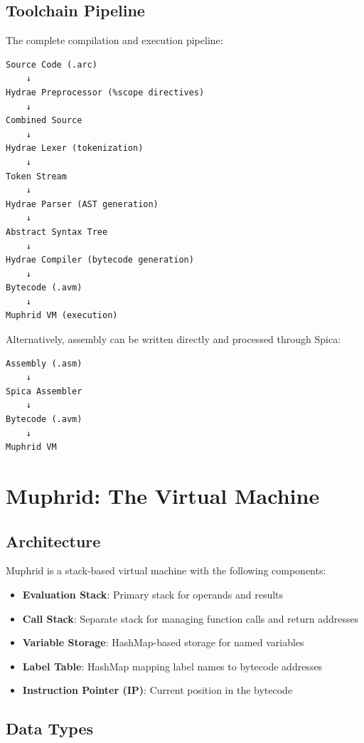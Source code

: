 \documentclass[11pt,a4paper]{article}
\begin{document}
\subsection{Toolchain Pipeline}

The complete compilation and execution pipeline:

\begin{verbatim}
Source Code (.arc)
    ↓
Hydrae Preprocessor (%scope directives)
    ↓
Combined Source
    ↓
Hydrae Lexer (tokenization)
    ↓
Token Stream
    ↓
Hydrae Parser (AST generation)
    ↓
Abstract Syntax Tree
    ↓
Hydrae Compiler (bytecode generation)
    ↓
Bytecode (.avm)
    ↓
Muphrid VM (execution)
\end{verbatim}

Alternatively, assembly can be written directly and processed through Spica:

\begin{verbatim}
Assembly (.asm)
    ↓
Spica Assembler
    ↓
Bytecode (.avm)
    ↓
Muphrid VM
\end{verbatim}

\newpage
\section{Muphrid: The Virtual Machine}

\subsection{Architecture}

Muphrid is a stack-based virtual machine with the following components:

\begin{itemize}
    \item \textbf{Evaluation Stack}: Primary stack for operands and results
    \item \textbf{Call Stack}: Separate stack for managing function calls and return addresses
    \item \textbf{Variable Storage}: HashMap-based storage for named variables
    \item \textbf{Label Table}: HashMap mapping label names to bytecode addresses
    \item \textbf{Instruction Pointer (IP)}: Current position in the bytecode
\end{itemize}

\subsection{Data Types}
\end{document}
